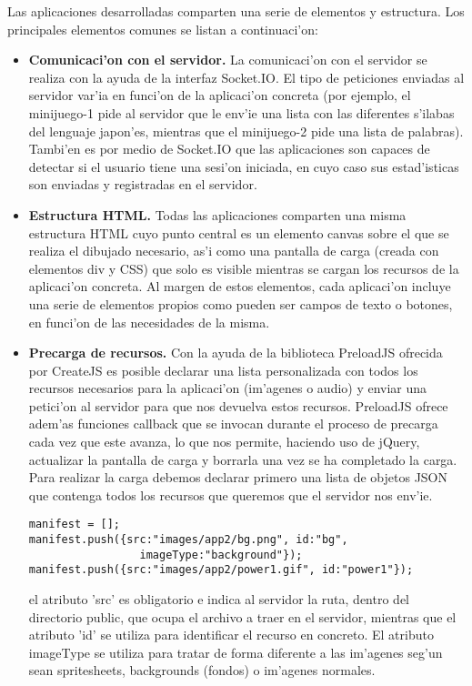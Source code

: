 Las aplicaciones desarrolladas comparten una serie de elementos y estructura. Los principales 
elementos comunes se listan a continuaci'on:

\begin{itemize}
\item \textbf{Comunicaci'on con el servidor.} La comunicaci'on con el servidor se realiza con la ayuda de la interfaz 
Socket.IO. El tipo de peticiones enviadas al servidor var'ia en funci'on de la aplicaci'on concreta (por ejemplo, el
minijuego-1 pide al servidor que le env'ie una lista con las diferentes s'ilabas del lenguaje japon'es, mientras que
el minijuego-2 pide una lista de palabras).
Tambi'en es por medio de Socket.IO que las aplicaciones son capaces de detectar si el usuario tiene una sesi'on 
iniciada, en cuyo caso sus estad'isticas son enviadas y registradas en el servidor.
\item \textbf{Estructura HTML.} Todas las aplicaciones comparten una misma estructura HTML cuyo punto central es un elemento
canvas sobre el que se realiza el dibujado necesario, as'i como una pantalla de carga (creada con elementos div y 
CSS) que solo es visible mientras se cargan los recursos de la aplicaci'on concreta.
Al margen de estos elementos, cada aplicaci'on incluye una serie de elementos propios como pueden ser campos de texto
o botones, en funci'on de las necesidades de la misma.
\item \textbf{Precarga de recursos.} Con la ayuda de la biblioteca PreloadJS ofrecida por CreateJS es posible declarar una
lista personalizada con todos los recursos necesarios para la aplicaci'on (im'agenes o audio) y enviar una petici'on
al servidor para que nos devuelva estos recursos.
PreloadJS ofrece adem'as funciones callback que se invocan durante el proceso de precarga cada vez que este avanza,
lo que nos permite, haciendo uso de jQuery, actualizar la pantalla de carga y borrarla una vez se ha completado la
carga.
Para realizar la carga debemos declarar primero una lista de objetos JSON que contenga todos los recursos que 
queremos que el servidor nos env'ie.

\begin{verbatim}
manifest = [];
manifest.push({src:"images/app2/bg.png", id:"bg", 
                 imageType:"background"});
manifest.push({src:"images/app2/power1.gif", id:"power1"});
\end{verbatim}

el atributo 'src' es obligatorio e indica al servidor la ruta, dentro del directorio public, que ocupa el archivo
a traer en el servidor, mientras que el atributo 'id' se utiliza para identificar el recurso en concreto. El atributo
imageType se utiliza para tratar de forma diferente a las im'agenes seg'un sean spritesheets, backgrounds (fondos)
o im'agenes normales.


\end{itemize}
